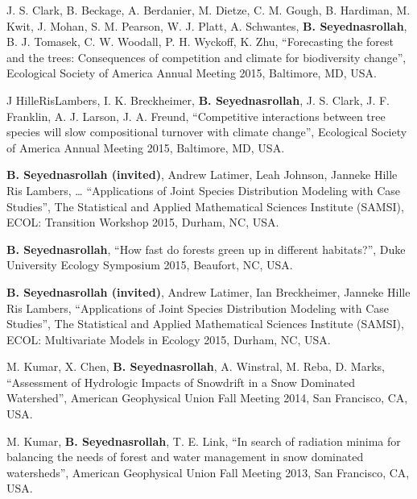 \documentclass[10pt]{article}
\newenvironment{changemargin}[2]{%
  \begin{list}{}{%
 \setlength{\topsep}{0pt}%
 \setlength{\leftmargin}{#1}%
 \setlength{\rightmargin}{#2}%
 \setlength{\listparindent}{\parindent}%
 \setlength{\itemindent}{\parindent}%
 \setlength{\parsep}{\parskip}%
  }%
  \item[]}{\end{list}
}
\newenvironment{body} {
  \vspace*{-2pt}
  \begin{changemargin}{-0.5in}{-0.5in}
}
{\end{changemargin}
}
\begin{document}
\begin{body}
\begin{etaremune}
    \item J. S. Clark, B. Beckage, A. Berdanier, M. Dietze, C. M. Gough, B. Hardiman, M. Kwit, J. Mohan, S. M. Pearson, W. J. Platt, A. Schwantes, \textbf{B. Seyednasrollah}, B. J. Tomasek, C. W. Woodall, P. H. Wyckoff, K. Zhu, ``Forecasting the forest and the trees: Consequences of competition and climate for biodiversity change'', Ecological Society of America Annual Meeting 2015, Baltimore, MD, USA.\\
    \medskip

    \item J HilleRisLambers, I. K. Breckheimer, \textbf{B. Seyednasrollah}, J. S. Clark, J. F. Franklin, A. J. Larson, J. A. Freund, ``Competitive interactions between tree species will slow compositional turnover with climate change'', Ecological Society of America Annual Meeting 2015, Baltimore, MD, USA.\\
    \medskip

    \item \textbf{B. Seyednasrollah (invited)}, Andrew Latimer, Leah Johnson, Janneke Hille Ris Lambers, … ``Applications of Joint Species Distribution Modeling with Case Studies'', The Statistical and Applied Mathematical Sciences Institute (SAMSI), ECOL: Transition Workshop 2015, Durham, NC, USA.\\
    \medskip

    \item \textbf{B. Seyednasrollah}, ``How fast do forests green up in different habitats?'', Duke University Ecology Symposium 2015, Beaufort, NC, USA.\\
    \medskip

    \item \textbf{B. Seyednasrollah (invited)}, Andrew Latimer, Ian Breckheimer, Janneke Hille Ris Lambers, ``Applications of Joint Species Distribution Modeling with Case Studies'', The Statistical and Applied Mathematical Sciences Institute (SAMSI), ECOL: Multivariate Models in Ecology 2015, Durham, NC, USA.\\
    \medskip

    \item M. Kumar, X. Chen, \textbf{B. Seyednasrollah}, A. Winstral, M. Reba, D. Marks, ``Assessment of Hydrologic Impacts of Snowdrift in a Snow Dominated Watershed'', American Geophysical Union Fall Meeting 2014, San Francisco, CA, USA.\\
    \medskip

    \item M. Kumar, \textbf{B. Seyednasrollah}, T. E. Link, ``In search of radiation minima for balancing the needs of forest and water management in snow dominated watersheds'', American Geophysical Union Fall Meeting 2013, San Francisco, CA, USA.\\
    \medskip


\end{etaremune}
\end{body}
\end{document}
